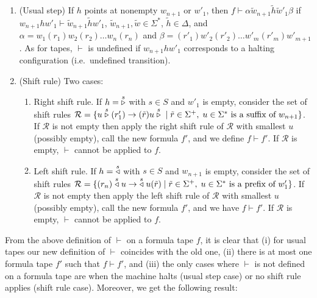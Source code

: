 \begin{enumerate}
    \item (Usual step) If $h$ points at nonempty $w_{n+1}$ or $w'_1$, then $f \vdash \alpha \tilde{w}_{n+1} \tilde{h} \tilde{w}'_1\beta$ if $w_{n+1} h w'_1 \vdash \tilde{w}_{n+1} \tilde{h} w'_1$, $\tilde{w}_{n+1}, \tilde{w} \in \Sigma^*$, $\tilde{h} \in \Delta$, and $\alpha=w_1(r_1)w_2(r_2)\dots w_n(r_n)$ and $\beta=(r'_1)w'_2(r'_2)\dots w'_m(r'_m) w'_{m+1}$. As for tapes, $\vdash$ is undefined if $w_{n+1} h w'_1$ corresponds to a halting configuration (i.e.\ undefined transition).
    \item (Shift rule) Two cases:
          \begin{enumerate}

              \item Right shift rule. If $h=\;\stackrel{s}\triangleright$ with $s\in S$ and $w'_1$ is empty, consider the set of shift rules $\mathcal{R} = \{ u \stackrel{s}\triangleright(r'_1) \to (\tilde{r})u\stackrel{s}\triangleright \; | \; \tilde{r}\in\Sigma^+,\; u\in\Sigma^* \text{ is a suffix of } w_{n+1}\}$. If $\mathcal{R}$ is not empty then apply the right shift rule of $\mathcal{R}$ with smallest $u$ (possibly empty), call the new formula $f'$, and we define $f \vdash f'$. If $\mathcal{R}$ is empty, $\vdash$ cannot be applied to $f$.
              \item Left shift rule. If $h=\;\stackrel{s}\triangleleft$ with $s\in S$ and $w_{n+1}$ is empty, consider the set of shift rules $\mathcal{R} = \{ (r_{n})\stackrel{s}\triangleleft u \to \;\stackrel{s}\triangleleft u(\tilde{r}) \; | \; \tilde{r}\in\Sigma^+,\; u\in\Sigma^* \text{ is a prefix of } w'_{1}\}$. If $\mathcal{R}$ is not empty then apply the left shift rule of $\mathcal{R}$ with smallest $u$ (possibly empty), call the new formula $f'$, and we have $f \vdash f'$. If $\mathcal{R}$ is empty, $\vdash$ cannot be applied to $f$.

          \end{enumerate}

\end{enumerate}

From the above definition of $\vdash$ on a formula tape $f$, it is clear that (i) for usual tapes our new definition of $\vdash$ coincides with the old one, (ii) there is at most one formula tape $f'$ such that $f \vdash f'$, and (iii) the only cases where $\vdash$ is not defined on a formula tape are when the machine halts (usual step case) or no shift rule applies (shift rule case). Moreover, we get the following result:

